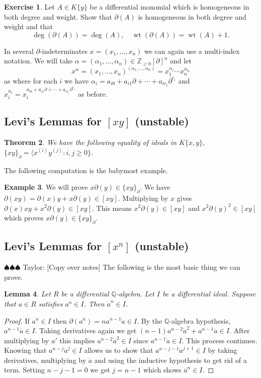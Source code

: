 \documentclass[12pt]{book}
\newcommand{\taylor}[1]{{\color{blue} \sf $\spadesuit\spadesuit\spadesuit$ Taylor: [#1]}}
\numberwithin{equation}{section}
\newtheorem{theorem}{Theorem}[subsection]
\newtheorem{lemma}[theorem]{Lemma}
\theoremstyle{definition}
\newtheorem{example}[theorem]{Example}
\newtheorem{exercise}[theorem]{Exercise}
\theoremstyle{remark}
\newcommand{\ZZ}{\mathbb{Z}}
\newcommand{\QQ}{\mathbb{Q}}
\newcommand{\wt}{\operatorname{wt}}
\begin{document}
\begin{exercise}
	Let $A \in K\lbrace y \rbrace$ be a differential monomial which is homogeneous in both degree and weight. Show that $\partial(A)$ is homogeneous in both degree and weight and that 
	$$ \deg(\partial(A)) = \deg(A), \quad \wt(\partial(A)) = \wt(A)+1.$$
\end{exercise}

In several $\partial$-indeterminates $x=(x_1,\ldots,x_n)$ we can again use a multi-index notation. 
We will take $\alpha = (\alpha_1,\ldots,\alpha_n) \in \ZZ_{\geq 0}[\partial]^n$ and let 
$$ x^{\alpha} = (x_1,\ldots,x_n)^{(\alpha_1,\ldots,\alpha_n)} = x_1^{\alpha_1}\cdots x_n^{\alpha_n}$$
as where for each $i$ we have $\alpha_i = a_{i0} + a_{i1}\partial + \cdots + a_{ir_i}\partial^{r_i}$ and $x_i^{\alpha_i} = x_i^{a_{i0} + a_{i1}\partial + \cdots + a_{ir_i}\partial^{r_i}}$ as before. 


\subsection{Levi's Lemmas for $[xy]$ (unstable) }

\begin{theorem}
	We have the following equality of ideals in $K\lbrace x,y\rbrace$,
	$\lbrace xy\rbrace_{\partial} = \langle x^{(i)}y^{(j)} \colon i,j \geq 0 \rbrace$.
\end{theorem}

The following computation is the babymost example. 
\begin{example}
	We will prove $x\partial(y) \in \lbrace xy\rbrace_{\partial}$.
	We have $\partial(xy) = \partial(x)y+x\partial(y) \in [xy]$.
	Multiplying by $x$ gives $\partial(x)xy + x^2\partial(y) \in [xy]$.
	This means $x^2\partial(y) \in [xy] $ and $x^2\partial(y)^2 \in [xy]$ which proves $x\partial(y) \in \lbrace xy\rbrace_{\partial}$.
\end{example}

\subsection{Levi's Lemmas for $[x^n]$ (unstable) }

\taylor{Copy over notes}
The following is the most basic thing we can prove. 
\begin{lemma}\label{lem:power-lemma}
	Let $R$ be a differential $\QQ$-algebra. 
	Let $I$ be a differential ideal. 
	Suppose that $a\in R$ satisfies $a^n \in I$. 
	Then $\dot{a}^{n} \in I$. 
\end{lemma}
\begin{proof}
	If $a^n \in I$ then $\partial(a^n) = n a^{n-1} \dot{a}\in I$. 
	By the $\QQ$-algebra hypothesis, $a^{n-1}\dot{a}\in I$. 
	Taking derivatives again we get $(n-1)a^{n-2}\dot{a}^2 + a^{n-1}\ddot{a}\in I.$
	After multiplying by $a'$ this implies $a^{n-2} \dot{a}^2 \in I$ since $a^{n-1}\dot{a} \in I$.
	This process continues. 
	Knowing that $a^{n-j}\dot{a}^j \in I$ allows us to show that $a^{n-j-1}\dot{a}^{j+1} \in I$ by taking derivatives, multiplying by $\dot{a}$ and using the inductive hypothesis to get rid of a term. 
	Setting $n-j-1=0$ we get $j=n-1$ which shows $\dot{a}^n \in I$.
\end{proof}
\end{document}
